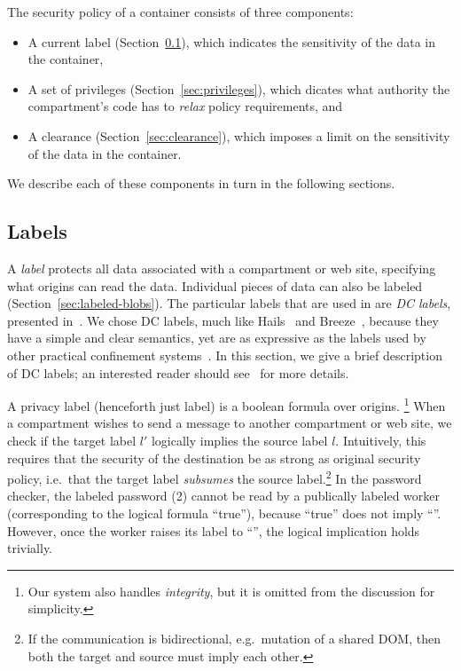 The security policy of a container consists of three components:

\begin{itemize}
    \item A current label (Section~\ref{sec:labels}), which indicates the
        sensitivity of the data in the container,
    \item A set of privileges (Section~\ref{sec:privileges}), which
        dicates what authority the compartment's code has to
        \emph{relax} policy requirements, and
    \item A clearance (Section~\ref{sec:clearance}), which imposes a
        limit on the sensitivity of the data in the container.
\end{itemize}

We describe each of these components in turn in the following sections.

\subsection{Labels}
\label{sec:labels}

A \emph{label} protects all data associated with a compartment or
web site, specifying what origins can read the data.
%
Individual pieces of data can also be labeled (Section~\ref{sec:labeled-blobs}).
%
The particular labels that are used in \sys{} are \emph{DC labels},
presented in~\cite{stefan:2011:dclabels}.
%
We chose DC labels, much like Hails~\cite{giffin:2012:hails} and
Breeze~\cite{Breeze13}, because they have a simple and clear
semantics, yet are as expressive as the labels used by other practical
confinement systems~\cite{GenLabels}.
%
In this section, we give a brief description of DC labels; an interested
reader should see~\cite{stefan:2011:dclabels} for more details.

A privacy label (henceforth just label) is a boolean formula over
origins.%
%
\footnote{
  Our system also handles \emph{integrity}, but it is omitted from
  the discussion for simplicity.
}
%
When a compartment wishes to send a message to another compartment or
web site, we check if the target label $l'$ logically implies the source
label $l$.
%
Intuitively, this requires that the security of the destination be as strong as original security policy, i.e.\ that the target label \emph{subsumes} the source label.\footnote{If the communication is bidirectional, e.g.\ mutation of a shared DOM, then both the target and source must imply each other.}
%
In the password checker, the labeled password (2) cannot be read by a
publically labeled worker (corresponding to the logical formula
``true''), because ``true'' does not imply ``''.
%
However, once the worker raises its label to ``'', the
logical implication holds trivially.

